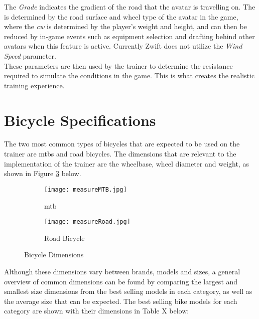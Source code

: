 The \textit{Grade} indicates the gradient of the road that the avatar is travelling on. The  is determined by the road surface and wheel type of the avatar in the game, where the \textit{\ac{cw}} is determined by the player's weight and height, and can then be reduced by in-game events such as equipment selection and drafting behind other avatars when this feature is active. Currently Zwift does not utilize the \textit{Wind Speed} parameter.\\
These parameters are then used by the trainer to determine the resistance required to simulate the conditions in the game. This is what creates the realistic training experience.

\section{Bicycle Specifications}
The two most common types of bicycles that are expected to be used on the trainer are \acp{mtb} and road bicycles. The dimensions that are relevant to the implementation of the trainer are the wheelbase, wheel diameter and weight, as shown in Figure \ref{fig:bikeDim} below.

\begin{figure}[H]
	\centering
	\begin{subfigure}{.5\textwidth}
		\centering
		\texttt{[image: measureMTB.jpg]}
		\caption{\ac{mtb} \citep[model by:][]{Pratama:2021}}
		\label{fig:sub1}
	\end{subfigure}%
	\begin{subfigure}{.5\textwidth}
		\centering
		\texttt{[image: measureRoad.jpg]}
		\caption{Road Bicycle \citep[model by:][]{Morozev:2017}}
		\label{fig:sub2}
	\end{subfigure}
	\caption{Bicycle Dimensions}
	\label{fig:bikeDim}
\end{figure}

Although these dimensions vary between brands, models and sizes, a general overview of common dimensions can be found by comparing the largest and smallest size dimensions from the best selling models in each category, as well as the average size that can be expected. The best selling bike models for each category are shown with their dimensions in Table X below: \citep{Lin:2021}

